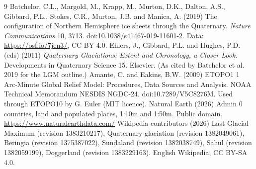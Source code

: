 \documentclass[11pt,a4paper]{article}
\begin{document}
\begin{thebibliography}{9}
 Batchelor, C.L., Margold, M., Krapp, M., Murton, D.K., Dalton, A.S., Gibbard, P.L., Stokes, C.R., Murton, J.B. and Manica, A. (2019) The configuration of Northern Hemisphere ice sheets through the Quaternary. \textit{Nature Communications} 10, 3713. doi:10.1038/s41467-019-11601-2. Data: \url{https://osf.io/7jen3/}, CC BY 4.0.
 Ehlers, J., Gibbard, P.L. and Hughes, P.D. (eds) (2011) \textit{Quaternary Glaciations: Extent and Chronology, a Closer Look}. Developments in Quaternary Science 15. Elsevier. (As cited by Batchelor et al. 2019 for the LGM outline.)
 Amante, C. and Eakins, B.W. (2009) ETOPO1 1 Arc-Minute Global Relief Model: Procedures, Data Sources and Analysis. NOAA Technical Memorandum NESDIS NGDC-24. doi:10.7289/V5C8276M. Used through ETOPO10 by G. Euler (MIT licence).
 Natural Earth (2026) Admin 0 countries, land and populated places, 1:10m and 1:50m. Public domain. \url{https://www.naturalearthdata.com/}
 Wikipedia contributors (2026) Last Glacial Maximum (revision 1383210217), Quaternary glaciation (revision 1382049061), Beringia (revision 1375387022), Sundaland (revision 1382038749), Sahul (revision 1382059199), Doggerland (revision 1383229163). English Wikipedia, CC BY-SA 4.0.
\end{thebibliography}
\end{document}
